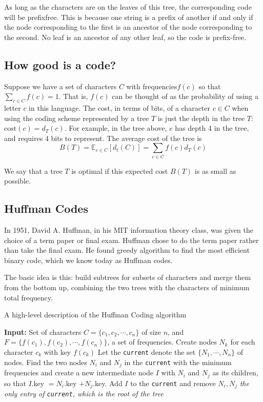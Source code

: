 \documentclass [12pt]{article}
\theoremstyle{definition}
\begin{document}
As long as the characters are on the leaves of this tree, the corresponding code will be 
prefixfree. This is because one string is a prefix of another if and only if the node corresponding to the first is an ancestor of the node corresponding to the second. No leaf is an ancestor of any other leaf, so the code is prefix-free.


\subsection{How good is a code?}
Suppose we have a set of characters $C$ with frequencies$ f (c)$ so that $\sum_{c\in C} f (c) = 1$. That is, $f (c)$ can be thought of as the probability of using a letter $c$ in this language. The cost, in terms of bits, of a character $c \in C$ when using the coding scheme represented by a tree $T$ is just the depth in the tree $T$: $\text{cost}(c) = d_T(c)$. For example, in the tree above, $e$ has depth 4 in the tree, and requires 4 bits to represent. The average cost of the tree is
$$
B(T) = \mathbb{E}_{c \in C}[d_t(C)] = \sum_{c \in C} f(c)d_T(c)
$$

We say that a tree $T$ is optimal if this expected cost $B(T)$ is as small as possible.

\subsection{Huffman Codes}

In 1951, David A. Huffman, in his MIT information theory class, was given the choice of a
term paper or final exam. Huffman chose to do the term paper rather than take the final
exam. He found greedy algorithm to find the most efficient binary code, which we know today
as Huffman codes.

The basic idea is this: build subtrees for subsets of characters and merge them from the
bottom up, combining the two trees with the characters of minimum total frequency.

\begin{algorithm}
\caption{A high-level description of the Huffman Coding algorithm}
\label{alg:huffman_algo}
\begin{algorithmic}
\State \textbf{Input:} Set of characters $C = \{c_1, c_2, \cdots, c_n \}$ of size $n$, and $F = \{f(c_1), f(c_2), \cdots, f(c_n) \}$, a set of frequencies.
\State Create nodes $N_k$ for each character $c_k$ with key $f(c_k)$
\State Let the \texttt{current} denote the set $\{N_1, \cdots, N_n\}$ of nodes.
\State {} {
    \State Find the two nodes $N_i$ and $N_j$ in the \texttt{current} with the minimum frequencies and create a new intermediate node $I$ with $N_i$ and $N_j$ as its children, so that $I$.key $= N_i$.key $+ N_j$.key.
    \State Add $I$ to the \texttt{current} and remove $N_i, N_j$
}
\State \Return \textit{the only entry of \texttt{current}, which is the root of the tree}
\end{algorithmic}
\end{algorithm}
\end{document}
